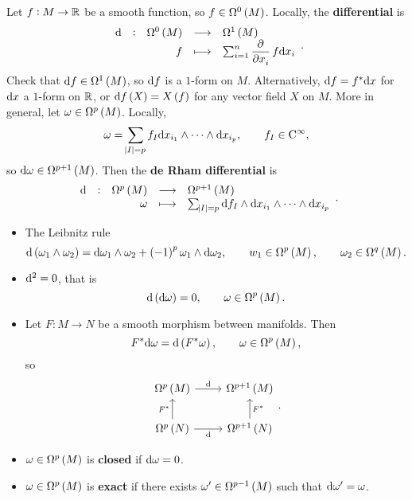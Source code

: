Let $ f : M \to \mathbb{R} $ be a smooth function, so $ f \in \Omega^0\br{M} $. Locally, the \textbf{differential} is
$$ \function[\d]{\Omega^0\br{M}}{\Omega^1\br{M}}{f}{\sum_{i = 1}^n \dpd{}{x_i}f\d x_i}. $$
Check that $ \d f \in \Omega^1\br{M} $, so $ \mathrm{d} f $ is a $ 1 $-form on $ M $. Alternatively, $ \mathrm{d} f = f^*\mathrm{d} x $ for $ \mathrm{d} x $ a $ 1 $-form on $ \mathbb{R} $, or $ \d f\br{X} = X\br{f} $ for any vector field $ X $ on $ M $. More in general, let $ \omega \in \Omega^p\br{M} $. Locally,
$$ \omega = \sum_{\abs{I} = p} f_I\mathrm{d} x_{i_1} \wedge \dots \wedge \mathrm{d} x_{i_p}, \qquad f_I \in \mathrm{C}^\infty, $$
so $ \d\omega \in \Omega^{p + 1}\br{M} $. Then the \textbf{de Rham differential} is
$$ \function[\d]{\Omega^p\br{M}}{\Omega^{p + 1}\br{M}}{\omega}{\sum_{\abs{I} = p} \d f_I \wedge \d x_{i_1} \wedge \dots \wedge \d x_{i_p}}. $$

\pagebreak

\begin{proposition}
\label{prop:1.16}
\hfill
\begin{itemize}
\item The Leibnitz rule
$$ \d\br{\omega_1 \wedge \omega_2} = \d\omega_1 \wedge \omega_2 + \br{-1}^p\omega_1 \wedge \d\omega_2, \qquad w_1 \in \Omega^p\br{M}, \qquad \omega_2 \in \Omega^q\br{M}. $$
\item $ \mathrm{d}^2 = 0 $, that is
$$ \d\br{\d\omega} = 0, \qquad \omega \in \Omega^p\br{M}. $$
\item Let $ F : M \to N $ be a smooth morphism between manifolds. Then
$$ F^*\d\omega = \d\br{F^*\omega}, \qquad \omega \in \Omega^p\br{M}, $$
so
$$
\begin{tikzcd}
\Omega^p\br{M} \arrow{r}{\d} & \Omega^{p + 1}\br{M} \\
\Omega^p\br{N} \arrow{u}{F^*} \arrow{r}[swap]{\d} & \Omega^{p + 1}\br{N} \arrow{u}[swap]{F^*}
\end{tikzcd}.
$$
\end{itemize}
\end{proposition}


\begin{definition}
\hfill
\begin{itemize}
\item $ \omega \in \Omega^p\br{M} $ is \textbf{closed} if $ \mathrm{d}\omega = 0 $.
\item $ \omega \in \Omega^p\br{M} $ is \textbf{exact} if there exists $ \omega' \in \Omega^{p - 1}\br{M} $ such that $ \mathrm{d}\omega' = \omega $.
\end{itemize}
\end{definition}

